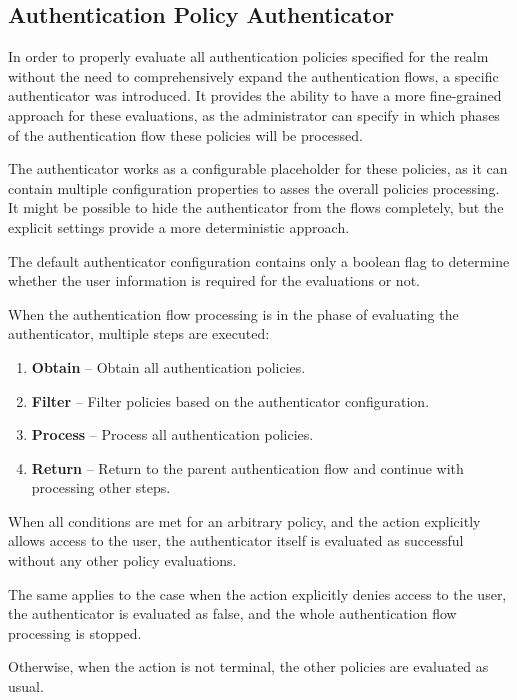 \newpage

\subsection{Authentication Policy Authenticator}
In order to properly evaluate all authentication policies specified for the realm without the need to comprehensively expand the authentication flows, a specific authenticator was introduced.
It provides the ability to have a more fine-grained approach for these evaluations, as the administrator can specify in which phases of the authentication flow these policies will be processed.

The authenticator works as a configurable placeholder for these policies, as it can contain multiple configuration properties to asses the overall policies processing.
It might be possible to hide the authenticator from the flows completely, but the explicit settings provide a more deterministic approach.

The default authenticator configuration contains only a boolean flag to determine whether the user information is required for the evaluations or not.

When the authentication flow processing is in the phase of evaluating the authenticator, multiple steps are executed:

\begin{enumerate}
    \item \textbf{Obtain} -- Obtain all authentication policies.
    \item \textbf{Filter} -- Filter policies based on the authenticator configuration.
    \item \textbf{Process} -- Process all authentication policies.
    \item \textbf{Return} -- Return to the parent authentication flow and continue with processing other steps.
\end{enumerate}

When all conditions are met for an arbitrary policy, and the action explicitly allows access to the user, the authenticator itself is evaluated as successful without any other policy evaluations.

The same applies to the case when the action explicitly denies access to the user, the authenticator is evaluated as false, and the whole authentication flow processing is stopped.

Otherwise, when the action is not terminal, the other policies are evaluated as usual.

